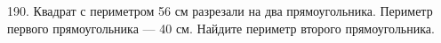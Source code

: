 190.  Квадрат с периметром 56 см разрезали на два прямоугольника. Периметр первого прямоугольника --- 40 см. Найдите периметр второго прямоугольника.\\
